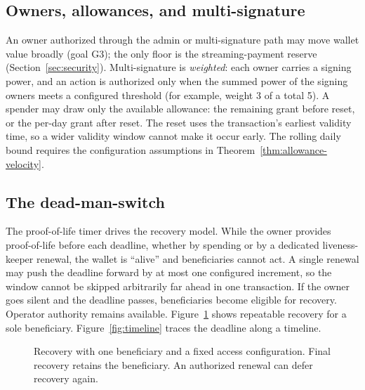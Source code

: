 \documentclass[11pt,DIV=11,parskip=half-]{scrartcl}
\begin{document}
\subsection{Owners, allowances, and multi-signature}
An owner authorized through the admin or multi-signature path may move wallet value broadly (goal G3); the only floor is the streaming-payment reserve (Section~\ref{sec:security}). Multi-signature is \emph{weighted}: each owner carries a signing power, and an action is authorized only when the summed power of the signing owners meets a configured threshold (for example, weight 3 of a total 5). A spender may draw only the available allowance: the remaining grant before reset, or the per-day grant after reset.
The reset uses the transaction's earliest validity time, so a wider validity window cannot make it occur early.
The rolling daily bound requires the configuration assumptions in Theorem~\ref{thm:allowance-velocity}.

\subsection{The dead-man-switch}
The proof-of-life timer drives the recovery model. While the owner provides \gls{proof-of-life} before each deadline, whether by spending or by a dedicated liveness-keeper renewal, the wallet is ``alive'' and beneficiaries cannot act. A single renewal may push the deadline forward by at most one configured increment, so the window cannot be skipped arbitrarily far ahead in one transaction. If the owner goes silent and the deadline passes, beneficiaries become eligible for recovery. Operator authority remains available. Figure~\ref{fig:statemachine_continuous_time} shows repeatable recovery for a sole beneficiary. Figure~\ref{fig:timeline} traces the deadline along a timeline.

\begin{figure}[htbp]
\centering
{}
\caption{Recovery with one beneficiary and a fixed access configuration. Final recovery retains the beneficiary. An authorized renewal can defer recovery again.} \label{fig:statemachine_continuous_time}
\end{figure}
\end{document}
